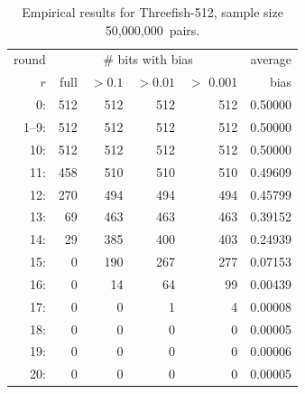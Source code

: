 \documentclass[11pt,twoside]{article}
\begin{document}
\begin{table}[tbh]
  \centering
\begin{tabular}{|r|rrrr|r|}
\hline
round & \multicolumn{ 4}{c|}{\# bits with bias} & average\\
$r$ & \quad full & $>0.1$ & $>0.01$ & $>$ 0.001 & bias \\  \hline
 0: &  512 &  512 &  512 &  512 & 0.50000  \\
 1--9: &  512 &  512 &  512 &  512 & 0.50000  \\
 10: &  512 &  512 &  512 &  512 & 0.50000  \\
 11: &  458 &  510 &  510 &  510 & 0.49609  \\
 12: &  270 &  494 &  494 &  494 & 0.45799  \\
 13: &  69 &  463 &  463 &  463 & 0.39152  \\
 14: &  29 &  385 &  400 &  403 & 0.24939  \\
 15: &  0 &  190 &  267 &  277 & 0.07153  \\
 16: &  0 &  14 &  64 &  99 & 0.00439  \\
 17: &  0 &  0 &  1 &  4 & 0.00008  \\
 18: &  0 &  0 &  0 &  0 & 0.00005  \\
 19: &  0 &  0 &  0 &  0 & 0.00006  \\
 20: &  0 &  0 &  0 &  0 & 0.00005  \\
\hline
\end{tabular}
\caption{Empirical results for Threefish-512, sample size 50,000,000~pairs.}
\label{tab:ObservationsFor512}
\end{table}
\end{document}
